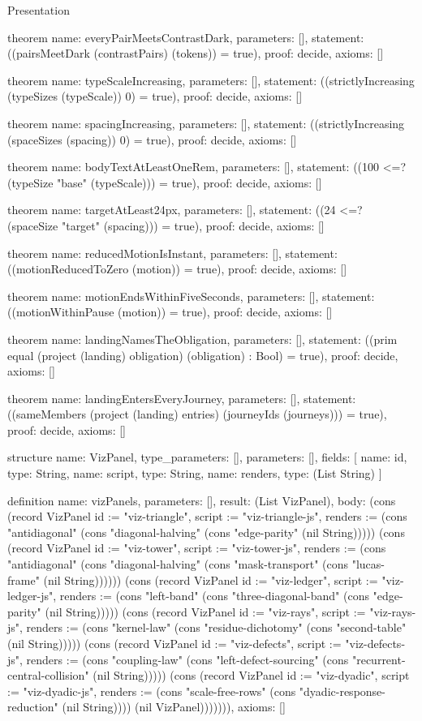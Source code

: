\begin{lexlean}{Presentation}
\begin{semanticmodule}
theorem{
  name: everyPairMeetsContrastDark,
  parameters: [],
  statement: ((pairsMeetDark (contrastPairs) (tokens)) = true),
  proof: decide{},
  axioms: []
}

theorem{
  name: typeScaleIncreasing,
  parameters: [],
  statement: ((strictlyIncreasing (typeSizes (typeScale)) 0) = true),
  proof: decide{},
  axioms: []
}

theorem{
  name: spacingIncreasing,
  parameters: [],
  statement: ((strictlyIncreasing (spaceSizes (spacing)) 0) = true),
  proof: decide{},
  axioms: []
}

theorem{
  name: bodyTextAtLeastOneRem,
  parameters: [],
  statement: ((100 <=? (typeSize "base" (typeScale))) = true),
  proof: decide{},
  axioms: []
}

theorem{
  name: targetAtLeast24px,
  parameters: [],
  statement: ((24 <=? (spaceSize "target" (spacing))) = true),
  proof: decide{},
  axioms: []
}

theorem{
  name: reducedMotionIsInstant,
  parameters: [],
  statement: ((motionReducedToZero (motion)) = true),
  proof: decide{},
  axioms: []
}

theorem{
  name: motionEndsWithinFiveSeconds,
  parameters: [],
  statement: ((motionWithinPause (motion)) = true),
  proof: decide{},
  axioms: []
}

theorem{
  name: landingNamesTheObligation,
  parameters: [],
  statement: ((prim equal (project (landing) obligation) (obligation) : Bool) = true),
  proof: decide{},
  axioms: []
}

theorem{
  name: landingEntersEveryJourney,
  parameters: [],
  statement: ((sameMembers (project (landing) entries) (journeyIds (journeys))) = true),
  proof: decide{},
  axioms: []
}

structure{
  name: VizPanel,
  type_parameters: [],
  parameters: [],
  fields: [
    {name: id, type: String},
    {name: script, type: String},
    {name: renders, type: (List String)}
  ]
}

definition{
  name: vizPanels,
  parameters: [],
  result: (List VizPanel),
  body: (cons (record VizPanel {id := "viz-triangle", script := "viz-triangle-js", renders := (cons "antidiagonal" (cons "diagonal-halving" (cons "edge-parity" (nil String))))}) (cons (record VizPanel {id := "viz-tower", script := "viz-tower-js", renders := (cons "antidiagonal" (cons "diagonal-halving" (cons "mask-transport" (cons "lucas-frame" (nil String)))))}) (cons (record VizPanel {id := "viz-ledger", script := "viz-ledger-js", renders := (cons "left-band" (cons "three-diagonal-band" (cons "edge-parity" (nil String))))}) (cons (record VizPanel {id := "viz-rays", script := "viz-rays-js", renders := (cons "kernel-law" (cons "residue-dichotomy" (cons "second-table" (nil String))))}) (cons (record VizPanel {id := "viz-defects", script := "viz-defects-js", renders := (cons "coupling-law" (cons "left-defect-sourcing" (cons "recurrent-central-collision" (nil String))))}) (cons (record VizPanel {id := "viz-dyadic", script := "viz-dyadic-js", renders := (cons "scale-free-rows" (cons "dyadic-response-reduction" (nil String)))}) (nil VizPanel))))))),
  axioms: []
}


\end{semanticmodule}
\end{lexlean}
